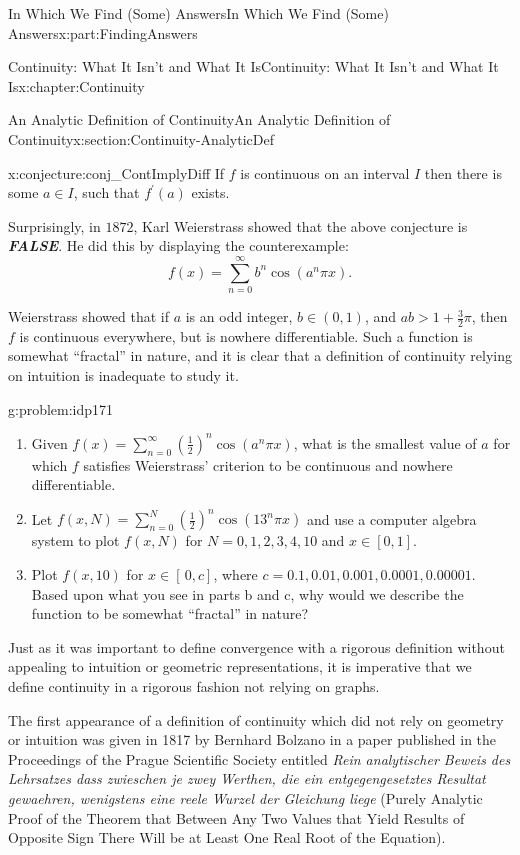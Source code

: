 \documentclass[oneside,10pt,]{book}
\newcommand{\alert}[1]{\textbf{\textit{#1}}}
\numberwithin{equation}{section}
\begin{document}
\begin{partptx}{In Which We Find (Some) Answers}{}{In Which We Find (Some) Answers}{}{}{x:part:FindingAnswers}
\begin{chapterptx}{Continuity: What It Isn't and What It Is}{}{Continuity: What It Isn't and What It Is}{}{}{x:chapter:Continuity}
\begin{sectionptx}{An Analytic Definition of Continuity}{}{An Analytic Definition of Continuity}{}{}{x:section:Continuity-AnalyticDef}
\begin{conjecture}{}{}{x:conjecture:conj_ContImplyDiff}
If \(f\) is continuous on an interval \(I\) then there is some \(a\in I\), such that \(f^\prime(a)\) exists.%
\end{conjecture}
Surprisingly, in \(1872\), Karl Weierstrass  showed that the above conjecture is \alert{FALSE}. He did this by displaying the counterexample:%
\begin{equation*}
f(x)=\sum_{n=0}^\infty b^n\cos(a^n\pi x)\text{.}
\end{equation*}
%
\par
Weierstrass showed that if \(a\) is an odd integer, \(b\in(0,1)\), and \(ab>1+\frac{3}{2}\pi\), then \(f\) is continuous everywhere, but is nowhere differentiable.  Such a function is somewhat ``fractal'' in nature, and it is clear that a definition of continuity relying on intuition is inadequate to study it.%
\begin{problem}{}{g:problem:idp171}%
\begin{enumerate}[font=\bfseries,label=(\alph*),ref=\alph*]
\item{}Given \(f(x)=\sum_{n=0}^\infty\left(\frac{1}{2}\right)^n\cos\left(a^n\pi
x\right)\), what is the smallest value of \(a\) for which \(f\) satisfies Weierstrass' criterion to be continuous and nowhere differentiable.%
\item{}Let \(f(x,N)=\sum_{n=0}^N\left(\frac{1}{2}\right)^n\cos\left(13^n\pi
x\right)\) and use a computer algebra system to plot \(f(x,N)\) for \(N=0,1,2,3,4,10\) and \(x\in[0,1]\).%
\item{}Plot \(f(x,10)\) for \(x\in[\,0,c]\), where \(c=0.1,0.01,0.001,0.0001,0.00001\).  Based upon what you see in parts b and c, why would we describe the function to be somewhat ``fractal'' in nature?%
\end{enumerate}
\end{problem}
Just as it was important to define convergence with a rigorous definition without appealing to intuition or geometric representations, it is imperative that we define continuity in a rigorous fashion not relying on graphs.%
\par
The first appearance of a definition of continuity which did not rely on geometry or intuition was given in 1817 by Bernhard Bolzano  in a paper published in the Proceedings of the Prague Scientific Society entitled \textit{Rein analytischer Beweis des Lehrsatzes dass zwieschen je zwey Werthen, die ein entgegengesetztes Resultat gewaehren, wenigstens eine reele Wurzel der Gleichung liege} (Purely Analytic Proof of the Theorem that Between Any Two Values that Yield Results of Opposite Sign There Will be at Least One Real Root of the Equation).%

\end{sectionptx}
\end{chapterptx}
\end{partptx}
\end{document}
